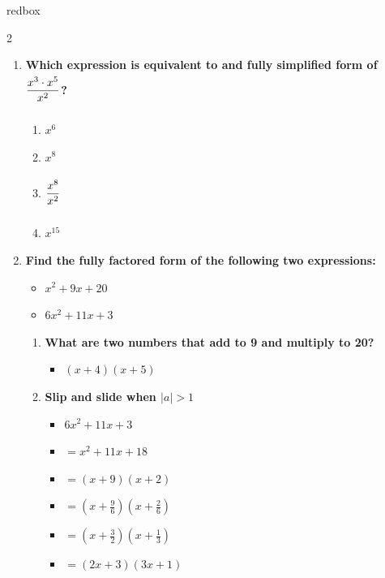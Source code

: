 \documentclass[10pt]{article}
\newcommand{\TallMath}[1]{$\displaystyle #1\rule[-1.4em]{0pt}{3.2em}$}
\begin{document}
\begin{skillbox}{redbox}
\begin{multicols}{2}
\begin{enumerate}
                \item \textbf{Which expression is equivalent to and
                fully simplified form of \TallMath{\frac{x^3 \cdot x^5}{x^2}}?}
                \begin{enumerate}[label=\Alph*.]
                    \item $x^6$
                    \item $x^8$
                    \item \TallMath{\frac{x^8}{x^2}}
                    \item $x^{15}$
                \end{enumerate}
                \columnbreak
                \item \textbf{Find the fully factored form of the following two expressions:}
                \begin{itemize}
                    \item $x^2+9x+20$
                    \item $6x^2+11x+3$
                \end{itemize}
                \begin{enumerate}
                    \item \textbf{What are two numbers that add to 9 and multiply to 20?}
                    \begin{itemize}
                        \item $(x+4)(x+5)$
                    \end{itemize}
                    \item \textbf{Slip and slide when $ |a| > 1$}
                    \begin{itemize}
                        \item $6x^2+11x+3$
                        \item $=x^2+11x+18$
                        \item $=\left( x+9 \right) \left( x+2 \right) $
                        \item $=\left( x+\frac{9}{6} \right) \left( x+\frac{2}{6} \right) $
                        \item $=\left( x+\frac{3}{2} \right) \left( x+\frac{1}{3} \right) $
                        \item $=\left( 2x+3 \right) \left( 3x+1 \right) $
                    \end{itemize}
                \end{enumerate}


\end{enumerate}
\end{multicols}
\end{skillbox}
\end{document}
